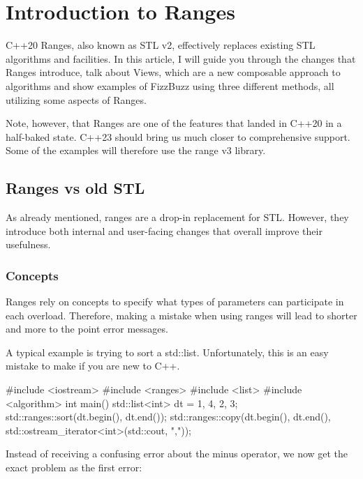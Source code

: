 \chapter{Introduction to  Ranges}

C++20 Ranges, also known as STL v2, effectively replaces existing STL algorithms and facilities. In this article, I will guide you through the changes that Ranges introduce, talk about Views, which are a new composable approach to algorithms and show examples of FizzBuzz using three different methods, all utilizing some aspects of Ranges.

Note, however, that Ranges are one of the features that landed in C++20 in a half-baked state. C++23 should bring us much closer to comprehensive support. Some of the examples will therefore use the range v3 library.

\section{Ranges vs old STL}

As already mentioned, ranges are a drop-in replacement for STL. However, they introduce both internal and user-facing changes that overall improve their usefulness.

\subsection{Concepts}

Ranges rely on concepts to specify what types of parameters can participate in each overload. Therefore, making a mistake when using ranges will lead to shorter and more to the point error messages.

A typical example is trying to sort a std::list. Unfortunately, this is an easy mistake to make if you are new to C++.

\begin{box-note}
\begin{cppcode}
#include <iostream>
#include <ranges>
#include <list>
#include <algorithm>
int main() {
    std::list<int> dt = {1, 4, 2, 3};
    std::ranges::sort(dt.begin(), dt.end());
    std::ranges::copy(dt.begin(), dt.end(), 
        std::ostream_iterator<int>(std::cout, ","));
}
\end{cppcode}
\end{box-note}

Instead of receiving a confusing error about the minus operator, we now get the exact problem as the first error:

